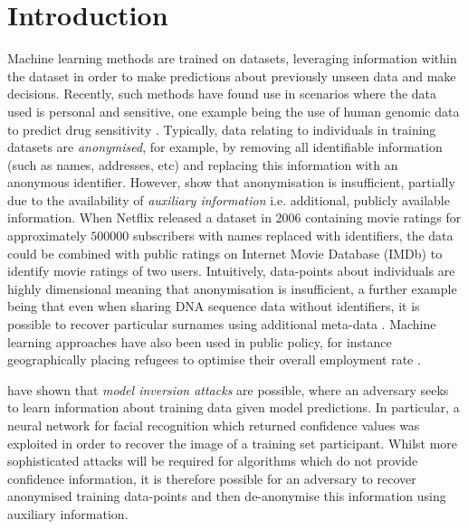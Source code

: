 \chapter{Introduction}
%
\graphicspath{{Introduction/Figs}}

Machine learning methods are trained on datasets, leveraging information within the dataset in order to make predictions about previously unseen data and make decisions. Recently, such methods have found use in scenarios where the data used is personal and sensitive, one example being the use of human genomic data to predict drug sensitivity \citep{drugSensitivity}. Typically, data relating to individuals in training datasets are \emph{anonymised}, for example, by removing all identifiable information (such as names, addresses, etc) and replacing this information with an anonymous identifier. However, \cite{netflix} show that anonymisation is insufficient, partially due to the availability of \emph{auxiliary information} i.e. additional, publicly available information. When Netflix released a dataset in 2006 containing movie ratings for approximately $500000$ subscribers with names replaced with identifiers, the data could be combined with public ratings on Internet Movie Database (IMDb) to identify movie ratings of two users. Intuitively, data-points about individuals are highly dimensional meaning that anonymisation is insufficient, a further example being that even when sharing DNA sequence data without identifiers, it is possible to recover particular surnames using additional meta-data \citep{gymrek2013identifying}. Machine learning approaches have also been used in public policy, for instance geographically placing refugees to optimise their overall employment rate \citep{bansak2018improving}. 

\citet{modelInversion} have shown that \emph{model inversion attacks} are possible, where an adversary seeks to learn information about training data given model predictions. In particular, a neural network for facial recognition which returned confidence values was exploited in order to recover the image of a training set participant. Whilst more sophisticated attacks will be required for algorithms which do not provide confidence information, it is therefore possible for an adversary to recover anonymised training data-points and then de-anonymise this information using auxiliary information. 

